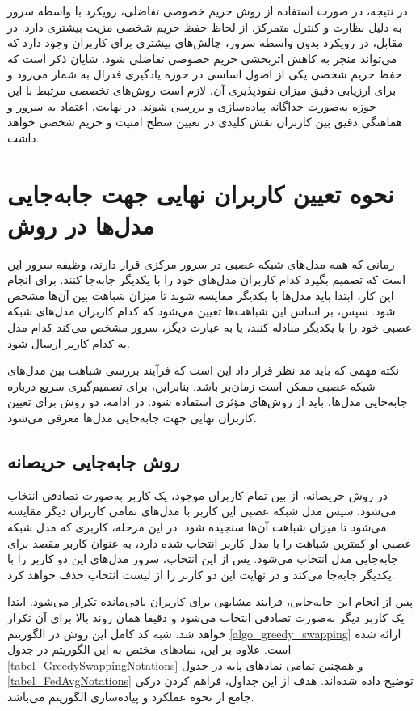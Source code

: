 در نتیجه، در صورت استفاده از روش حریم خصوصی تفاضلی، رویکرد با واسطه سرور به دلیل نظارت و کنترل متمرکز، از لحاظ حفظ حریم شخصی مزیت بیشتری دارد. در مقابل، در رویکرد بدون واسطه سرور، چالش‌های بیشتری برای کاربران وجود دارد که می‌تواند منجر به کاهش اثربخشی حریم خصوصی تفاضلی شود.
شایان ذکر است که حفظ حریم شخصی یکی از اصول اساسی در حوزه یادگیری فدرال به شمار می‌رود و برای ارزیابی دقیق میزان نفوذپذیری آن، لازم است روش‌های تخصصی مرتبط با این حوزه به‌صورت جداگانه پیاده‌سازی و بررسی شوند.
در نهایت، اعتماد به سرور و هماهنگی دقیق بین کاربران نقش کلیدی در تعیین سطح امنیت و حریم شخصی خواهد داشت.



\section{
	نحوه تعیین کاربران نهایی جهت جابه‌جایی مدل‌ها در روش
}
زمانی که همه مدل‌های شبکه عصبی در سرور مرکزی قرار دارند، وظیفه سرور این است که تصمیم بگیرد کدام کاربران مدل‌های خود را با یکدیگر جابه‌جا کنند. برای انجام این کار، ابتدا باید مدل‌ها با یکدیگر مقایسه شوند تا میزان شباهت بین آن‌ها مشخص شود. سپس، بر اساس این شباهت‌ها تعیین می‌شود که کدام کاربران مدل‌های شبکه عصبی خود را با یکدیگر مبادله کنند، یا به عبارت دیگر، سرور مشخص می‌کند کدام مدل به کدام کاربر ارسال شود.

نکته مهمی که باید مد نظر قرار داد این است که فرآیند بررسی شباهت بین مدل‌های شبکه عصبی ممکن است زمان‌بر باشد. بنابراین، برای تصمیم‌گیری سریع درباره جابه‌جایی مدل‌ها، باید از روش‌های مؤثری استفاده شود. در ادامه، دو روش برای تعیین کاربران نهایی جهت جابه‌جایی مدل‌ها معرفی می‌شود.


\subsection{
	روش جابه‌جایی حریصانه%
}\label{greedy_swapping}
در روش حریصانه، از بین تمام کاربران موجود، یک کاربر به‌صورت تصادفی انتخاب می‌شود. سپس مدل شبکه عصبی این کاربر با مدل‌های تمامی کاربران دیگر مقایسه می‌شود تا میزان شباهت آن‌ها سنجیده شود. در این مرحله، کاربری که مدل شبکه عصبی او کمترین شباهت را با مدل کاربر انتخاب‌ شده دارد، به عنوان کاربر مقصد برای جابه‌جایی مدل انتخاب می‌شود. پس از این انتخاب، سرور مدل‌های این دو کاربر را با یکدیگر جابه‌جا می‌کند و در نهایت این دو کاربر را از لیست انتخاب حذف خواهد کرد.

پس از انجام این جابه‌جایی، فرایند مشابهی برای کاربران باقی‌مانده تکرار می‌شود. ابتدا یک کاربر دیگر به‌صورت تصادفی انتخاب می‌شود و دقیقا همان روند بالا برای آن تکرار خواهد شد.
شبه کد کامل این روش در الگوریتم
\ref{algo_greedy_swapping}
ارائه شده است. علاوه بر این، نمادهای مختص به این الگوریتم در جدول
\ref{tabel_GreedySwappingNotations}
و همچنین تمامی نمادهای پایه در جدول
\ref{tabel_FedAvgNotations}
توضیح داده شده‌اند.
هدف از این جداول، فراهم کردن درکی جامع از نحوه عملکرد و پیاده‌سازی الگوریتم می‌باشد.


